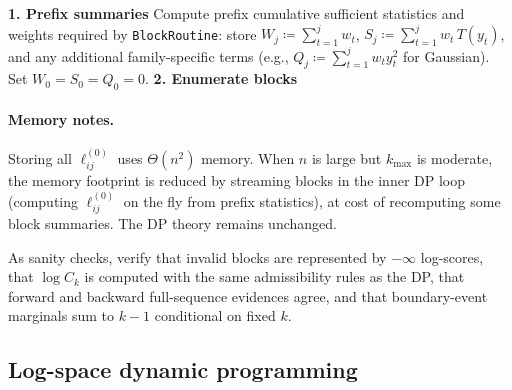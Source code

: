 \begin{algorithm}[H]
\caption{PrecomputeBlocks$(y,x,w,\texttt{BlockRoutine})$}
\label{alg:block-precompute}
\BlankLine
\textbf{1. Prefix summaries}\;
Compute prefix cumulative sufficient statistics and weights required by \texttt{BlockRoutine}:
store $W_j\coloneqq\sum_{t=1}^j w_t$, $S_j\coloneqq\sum_{t=1}^j w_t\,T(y_t)$, and any additional
family-specific terms (e.g., $Q_j\coloneqq\sum_{t=1}^j w_t y_t^2$ for Gaussian). Set $W_0=S_0=Q_0=0$.
\BlankLine
\textbf{2. Enumerate blocks}\;
\end{algorithm}

\paragraph{Memory notes.}
Storing all $\ell^{(0)}_{ij}$ uses $\Theta(n^2)$ memory.
When $n$ is large but $k_{\max}$ is moderate, the memory footprint is reduced by streaming
blocks in the inner DP loop (computing $\ell^{(0)}_{ij}$ on the fly from prefix statistics), at
cost of recomputing some block summaries.
The DP theory remains unchanged.

As sanity checks, verify that invalid blocks are represented by $-\infty$ log-scores, that $\log C_k$ is computed with the same admissibility rules as the DP, that forward and backward full-sequence evidences agree, and that boundary-event marginals sum to $k-1$ conditional on fixed $k$.

\subsection{Log-space dynamic programming}
\label{sec:alg-dp-impl}

